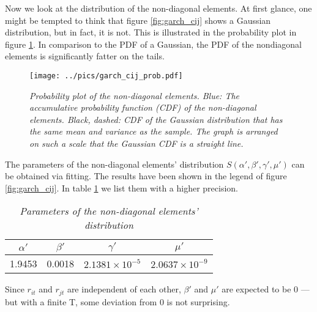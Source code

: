 \documentclass{report}
\begin{document}
Now we look at the distribution of the non-diagonal elements. At first
glance, one might be tempted to think that figure \ref{fig:garch_cij}
shows a Gaussian distribution, but in fact, it is not. This is
illustrated in the probability plot in figure
\ref{fig:garch_nondiag_probplot}. In comparison to the PDF of a
Gaussian, the PDF of the nondiagonal elements is significantly fatter
on the tails.
\begin{figure}[htb!]
  \centering
  \texttt{[image: ../pics/garch\_cij\_prob.pdf]}
    \caption{\small \it Probability plot of the non-diagonal
      elements. Blue: The accumulative probability function
      (CDF) of the non-diagonal elements. Black, dashed: CDF of the
      Gaussian distribution that has the same mean and variance as the
      sample. The graph is arranged on such a scale that the Gaussian
      CDF is a straight line.
    }
  \label{fig:garch_nondiag_probplot}
\end{figure}

The parameters of the non-diagonal elements' distribution $S(\alpha',
\beta', \gamma', \mu')$ can be obtained via fitting. The results have
been shown in the legend of figure \ref{fig:garch_cij}. In table
\ref{tab:garch_wishart_cij_params} we list them with a higher
precision.
\begin{table}[htb!]
  \centering
  \begin{tabular}{|c|c|c|c|}
    \hline
    $\alpha'$ & $\beta'$ & $\gamma'$ & $\mu'$ \\
    \hline
    1.9453 & 0.0018 & $2.1381 \times 10^{-5}$ & $2.0637\times 10^{-9}$ \\
    \hline
  \end{tabular}
  \caption{\small \it Parameters of the non-diagonal elements' distribution}
  \label{tab:garch_wishart_cij_params}
\end{table}
Since $r_{it}$ and $r_{jt}$ are independent of each other, $\beta'$
and $\mu'$ are expected to be 0 --- but with a finite T, some deviation
from 0 is not surprising.
\end{document}
